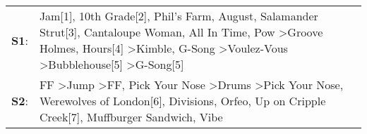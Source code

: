 \begin{supertabular}{p{0.03\textwidth}p{0.92\textwidth}}
 \textbf{S1}:  &  Jam[1]\textsuperscript{}, \enspace 10th Grade[2]\textsuperscript{}, \enspace Phil's Farm\textsuperscript{}, \enspace August\textsuperscript{}, \enspace Salamander Strut[3]\textsuperscript{}, \enspace Cantaloupe Woman\textsuperscript{}, \enspace All In Time\textsuperscript{}, \enspace Pow\textsuperscript{} \textgreater \enspace Groove Holmes\textsuperscript{}, \enspace Hours[4]\textsuperscript{} \textgreater \enspace Kimble\textsuperscript{}, \enspace G-Song\textsuperscript{} \textgreater \enspace Voulez-Vous\textsuperscript{} \textgreater \enspace Bubblehouse[5]\textsuperscript{} \textgreater \enspace G-Song[5]\textsuperscript{}  \enspace  \\
 \textbf{S2}:  &                                                                                                                                  FF\textsuperscript{} \textgreater \enspace Jump\textsuperscript{} \textgreater \enspace FF\textsuperscript{}, \enspace Pick Your Nose\textsuperscript{} \textgreater \enspace Drums\textsuperscript{} \textgreater \enspace Pick Your Nose\textsuperscript{}, \enspace Werewolves of London[6]\textsuperscript{}, \enspace Divisions\textsuperscript{}, \enspace Orfeo\textsuperscript{}, \enspace Up on Cripple Creek[7]\textsuperscript{}, \enspace Muffburger Sandwich\textsuperscript{}, \enspace Vibe\textsuperscript{}  \enspace  \\
\end{supertabular}
